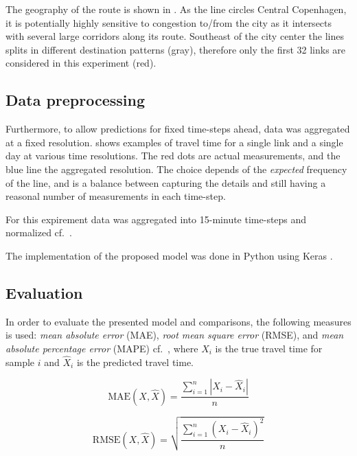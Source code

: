 \documentclass[preprint,11pt,5p,twocolumn]{elsarticle}
\begin{document}
The geography of the route is shown in . As the line circles Central Copenhagen, it is potentially highly sensitive to congestion to/from the city as it intersects with several large corridors along its route. Southeast of the city center the lines splits in different destination patterns (gray), therefore only the first 32 links are considered in this experiment (red).

\subsection{Data preprocessing}
Furthermore, to allow predictions for fixed time-steps ahead, data was aggregated at a fixed resolution.  shows examples of travel time for a single link and a single day at various time resolutions. The red dots are actual measurements, and the blue line the aggregated resolution. The choice depends of the \emph{expected} frequency of the line, and is a balance between capturing the details and still having a reasonal number of measurements in each time-step.

For this expirement data was aggregated into 15-minute time-steps and normalized cf.~.



The implementation of the proposed model was done in Python using Keras \cite{Keras}.




\subsection{Evaluation}
In order to evaluate the presented model and comparisons, the following measures is used: \emph{mean absolute error} (MAE), \emph{root mean square error} (RMSE), and \emph{mean absolute percentage error} (MAPE) cf.~, where $X_i$ is the true travel time for sample $i$ and $\widehat{X}_i$ is the predicted travel time.

\begin{equation}
    \textrm{MAE}(X, \widehat{X}) = \frac{\sum_{i = 1}^{n} \left| X_i - \widehat{X}_i \right| }{n}
    \label{eq:mae}
\end{equation}

\begin{equation}
    \textrm{RMSE}(X, \widehat{X}) = \sqrt{\frac{\sum_{i = 1}^{n} \left(X_i - \widehat{X}_i \right)^2}{n}}
    \label{eq:rmse}
\end{equation}
\end{document}
